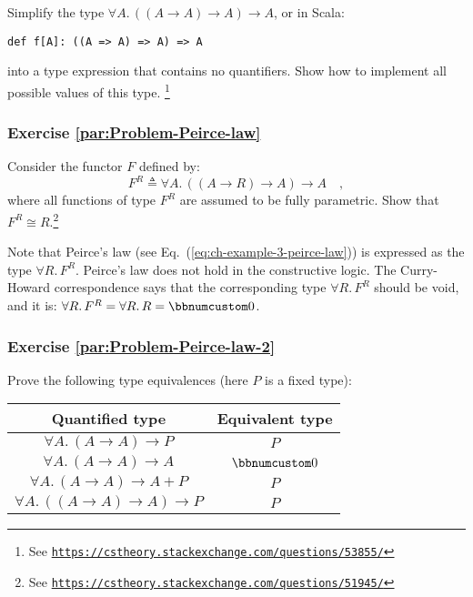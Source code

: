 Simplify the type $\forall A.\,((A\rightarrow A)\rightarrow A)\rightarrow A$,
or in Scala:
\begin{lstlisting}
def f[A]: ((A => A) => A) => A
\end{lstlisting}
into a type expression that contains no quantifiers. Show how to implement
all possible values of this type. \footnote{See \texttt{\href{https://cstheory.stackexchange.com/questions/53855/}{https://cstheory.stackexchange.com/questions/53855/}}}

\subsubsection{Exercise \label{par:Problem-Peirce-law}\ref{par:Problem-Peirce-law}}

Consider the functor $F$ defined by:
\[
F^{R}\triangleq\forall A.\,((A\rightarrow R)\rightarrow A)\rightarrow A\quad,
\]
where all functions of type $F^{R}$ are assumed to be fully parametric.
Show that $F^{R}\cong R$.\footnote{See \texttt{\href{https://cstheory.stackexchange.com/questions/51945/}{https://cstheory.stackexchange.com/questions/51945/}}}

Note that Peirce\textsf{'}s law (see Eq.~(\ref{eq:ch-example-3-peirce-law}))
is expressed as the type $\forall R.\,F^{R}$. Peirce\textsf{'}s law does not
hold in the constructive logic. The Curry-Howard correspondence says
that the corresponding type $\forall R.\,F^{R}$ should be void, and
it is: $\forall R.\,F^{R}=\forall R.\,R=\bbnum 0$. 

\subsubsection{Exercise \label{par:Problem-Peirce-law-2}\ref{par:Problem-Peirce-law-2}}

Prove the following type equivalences (here $P$ is a fixed type):
\begin{center}
\begin{tabular}{|c|c|}
\hline 
\textbf{\footnotesize{}Quantified type} & \textbf{\footnotesize{}Equivalent type}\tabularnewline
\hline 
\hline 
$\forall A.\,(A\rightarrow A)\rightarrow P$ & $P$\tabularnewline
\hline 
$\forall A.\,(A\rightarrow A)\rightarrow A$ & $\bbnum 0$\tabularnewline
\hline 
$\forall A.\,(A\rightarrow A)\rightarrow A+P$ & $P$\tabularnewline
\hline 
$\forall A.\,((A\rightarrow A)\rightarrow A)\rightarrow P$ & $P$\tabularnewline
\hline 
\end{tabular}
\par\end{center}

